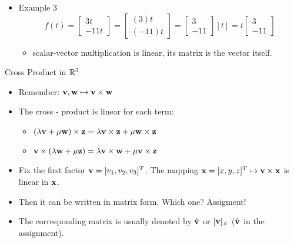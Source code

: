 \documentclass[8pt,dvipsnames]{beamer}
\begin{document}
\begin{frame}
\begin{itemize}
\begin{itemize}
    \end{itemize}
  \item Example 3
    $$
    f(t) = \begin{bmatrix}
      3t\\
      -11t
    \end{bmatrix}
    = \begin{bmatrix}
      (3)t\\
      (-11)t
    \end{bmatrix}=
    \begin{bmatrix}
      3\\-11
    \end{bmatrix}[t] = t\begin{bmatrix}
      3\\-11
    \end{bmatrix}
  $$
    \begin{itemize}
      \item[\raisebox{2mm}\dbend] scalar-vector multiplication is linear, its matrix is the vector itself.
    \end{itemize}
  \end{itemize}
\end{frame}


\begin{frame}{Cross Product in ${\mathbb R}^3$}
  \begin{itemize}
  \item Remember: ${\bf v},{\bf w}\mapsto {\bf v}\times {\bf w}$\vfill
  \item The cross - product is linear for each term:
    \begin{itemize}
    \item $(\lambda{\bf v} + \mu{\bf w})\times {\bf z} = \lambda{\bf v}\times {\bf z} + \mu{\bf w}\times {\bf z}$
    \item ${\bf v} \times(\lambda{\bf w} + \mu{\bf z}) = \lambda{\bf v}\times {\bf w} + \mu{\bf v}\times {\bf z}$
    \end{itemize}\vfill
  \item Fix the first factor ${\bf v} =  [v_1,v_2,v_3]^T$. The mapping ${\bf x} = [x,y,z]^T\mapsto {\bf v}\times{\bf x}$ is linear in ${\bf x}$.\vfill
  \item Then it can be written in matrix form. Which one? Assigment!\vfill
  \item The corresponding matrix is usually denoted by $\hat{{\bf v}}$ or $[{\bf v}]_\times$ ($\hat{{\bf v}}$ in the assignment).
  \end{itemize}
\end{frame}
\end{document}
